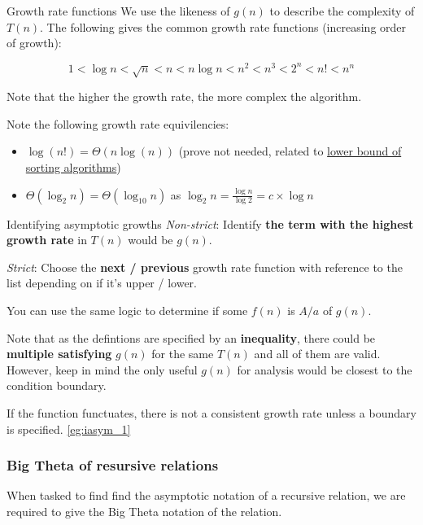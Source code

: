 \begin{knBox}
    {Growth rate functions}
    We use the likeness of $g(n)$ to describe the complexity of $T(n)$. The following gives the common growth rate functions (increasing order of growth):

    \[
        1 < \log n < \sqrt{n} < n < n\log n < n^2 < n^3 < 2^n < n! < n^n
    \]

    Note that the higher the growth rate, the more complex the algorithm.

    Note the following growth rate equivilencies:
    \begin{itemize}
        \item $\log(n!)=\Theta(n\log(n))$ (prove not needed, related to \hyperref[thm:lower_bound_sort]{lower bound of sorting algorithms})
        \item $\Theta(\log_2n)=\Theta(\log_{10}n)$ as $\log_2n = \frac{\log n}{\log 2} = c\times\log n$
    \end{itemize}
\end{knBox}

\begin{theorem}
    {Identifying asymptotic growths}
    \textit{Non-strict}: Identify \textbf{the term with the highest growth rate} in $T(n)$ would be $g(n)$.

    \textit{Strict}: Choose the \textbf{next / previous} growth rate function with reference to the list depending on if it's upper / lower.

    You can use the same logic to determine if some $f(n)$ is $A/a$ of $g(n)$.

    Note that as the defintions are specified by an \textbf{inequality}, there could be \textbf{multiple satisfying} $g(n)$ for the same $T(n)$ and all of them are valid. However, keep in mind the only useful $g(n)$ for analysis would be closest to the condition boundary.

    If the function functuates, there is not a consistent growth rate unless a boundary is specified.
    \tcblower
    \label{thm:iasym}
    \ref{eg:iasym_1}
\end{theorem}

\subsubsection{Big Theta of resursive relations}

When tasked to find find the asymptotic notation of a recursive relation, we are required to give the Big Theta notation of the relation.

